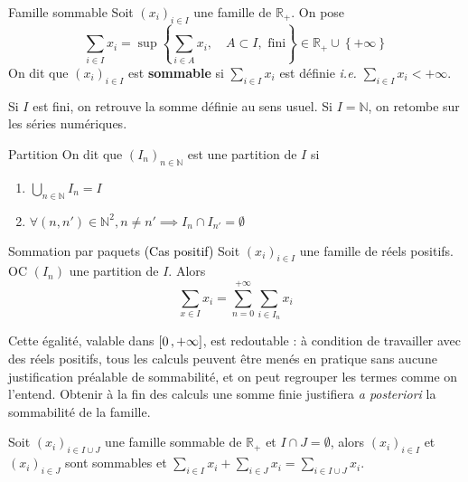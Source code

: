    \begin{defi}{Famille sommable}{}
        Soit $(x_i)_{i \in I}$ une famille de $\mathbb{R}_+$. On pose 
        \[ \sum_{i \in I} x_i = \sup\left\{\sum_{i \in A} x_i , \quad A \subset I, \text{ fini}\right\} \in \mathbb{R}_+ \cup \left\{+\infty\right\} \]   
        On dit que $(x_i)_{i \in I}$ est \textbf{sommable} si $\sum_{i \in I} x_i$ est définie \textit{i.e.} $\sum_{i \in I} x_i < + \infty$.
    \end{defi}

    Si $I$ est fini, on retrouve la somme définie au sens usuel. Si $I = \mathbb{N}$, on retombe sur les séries numériques.

    \begin{defi}{Partition}{}
        On dit que $(I_n)_{n \in \mathbb{N}}$ est une partition de $I$ si 
        \begin{enumerate}
            \item $\bigcup_{n \in \mathbb{N}} I_n = I$
            \item $\forall (n,n') \in \mathbb{N}^2, n \neq n' \implies I_n \cap I_{n'} = \emptyset$
        \end{enumerate}
    \end{defi}

    \begin{prop}{Sommation par paquets \textcolor{black}{(Cas positif)}}{}
        Soit $(x_i)_{i \in I}$ une famille de réels positifs. OC $(I_n)$ une partition de $I$. Alors 
        \[ \sum_{x \in I} x_i = \sum_{n=0}^{+\infty} \sum_{i \in I_n} x_i  \]  
    \end{prop}

    Cette égalité, valable dans $\left[ 0 \, , +\infty \right]$, est redoutable : à condition de travailler avec des réels positifs, tous les calculs peuvent être menés en pratique sans aucune justification préalable de sommabilité, et on peut regrouper les termes comme on l’entend. Obtenir à la fin des calculs une somme finie justifiera \textit{a posteriori} la sommabilité de la famille. 

    \begin{lem}{}{}
        Soit $(x_i)_{i \in I \cup J}$ une famille sommable de $\mathbb{R}_+$ et $I \cap J = \emptyset$, alors $(x_i)_{i \in I}$ et $(x_i)_{i \in J}$ sont sommables et $\sum_{i \in I} x_i + \sum_{i \in J} x_i = \sum_{i \in I \cup J} x_i$.
    \end{lem}

